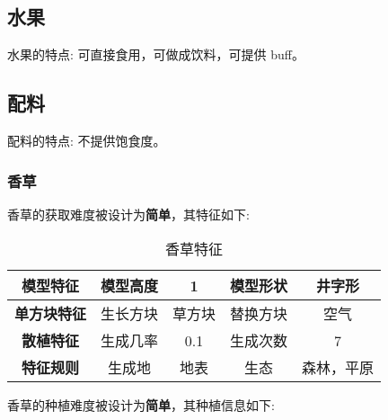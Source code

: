 \subsection{水果}

水果的特点: 可直接食用，可做成饮料，可提供 buff。

\subsection{配料}

配料的特点: 不提供饱食度。

\subsubsection{香草}

香草的获取难度被设计为\textbf{简单}，其特征如下:
\begin{table}[H]
    \centering
    \caption{香草特征}
    \label{table:香草特征}
    \setlength{\tabcolsep}{4mm}
    \begin{tabular}{c|cc|cc}
        \toprule
        \textbf{模型特征}   & 模型高度 & 1      & 模型形状 & 井字形     \\
        \midrule
        \textbf{单方块特征} & 生长方块 & 草方块 & 替换方块 & 空气       \\
        \midrule
        \textbf{散植特征}   & 生成几率 & 0.1    & 生成次数 & 7          \\
        \midrule
        \textbf{特征规则}   & 生成地   & 地表   & 生态     & 森林，平原 \\
        \bottomrule
    \end{tabular}
\end{table}


香草的种植难度被设计为\textbf{简单}，其种植信息如下:

